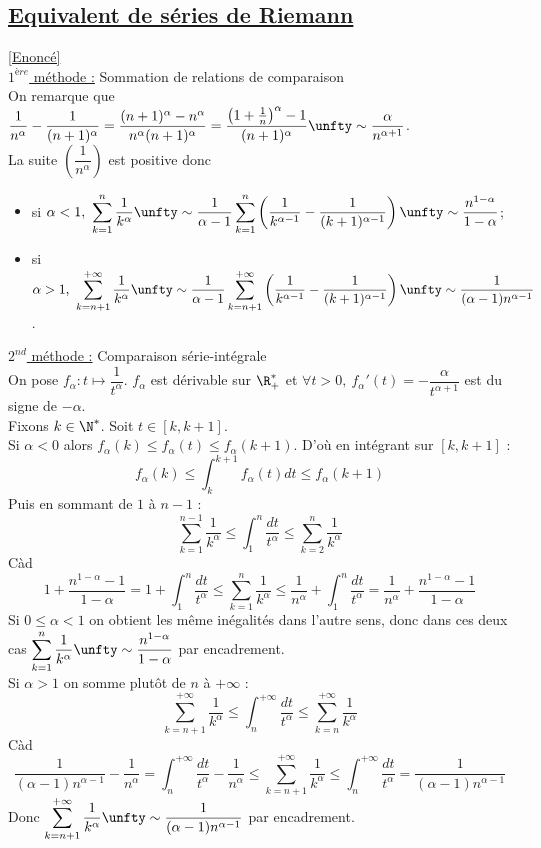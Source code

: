 \documentclass{book}
\begin{document}
	\subsection{\underline{Equivalent de séries de Riemann} }
	\label{sec:equivalent-de-series-de-riemann}
	\textcolor{blue}{\hyperref[Equivalent de séries de Riemann]{[Enoncé]}}\\
	\underline{$1^{ère}$ méthode :} Sommation de relations de comparaison\\
	On remarque que $\displaystyle\frac{1}{n^\alpha}-\frac{1}{(n+1)^\alpha}=\frac{(n+1)^\alpha-n^\alpha}{n^\alpha(n+1)^\alpha}=\frac{\left(1+\frac{1}{n}\right)^\alpha-1}{(n+1)^\alpha}\unfty\sim\frac{\alpha}{n^{\alpha+1}}$.\\
	La suite $\left(\dfrac{1}{n^\alpha}\right)$ est positive donc
	\begin{itemize}
		\item si $\alpha<1,\ \displaystyle\sum_{k=1}^n\frac{1}{k^\alpha}\unfty\sim\frac{1}{\alpha-1}\sum_{k=1}^n\left(\frac{1}{k^{\alpha-1}}-\frac{1}{(k+1)^{\alpha-1}}\right)\unfty\sim\frac{n^{1-\alpha}}{1-\alpha}$;
		\item si $\alpha>1,\ \displaystyle\sum_{k=n+1}^{+\infty}\frac{1}{k^\alpha}\unfty\sim\frac{1}{\alpha-1}\sum_{k=n+1}^{+\infty}\left(\frac{1}{k^{\alpha-1}}-\frac{1}{(k+1)^{\alpha-1}}\right)\unfty\sim\frac{1}{(\alpha-1)n^{\alpha-1}}$.
	\end{itemize}
	
	\underline{$2^{nd}$ méthode :} Comparaison série-intégrale\\
	On pose $f_\alpha:t\mapsto\dfrac{1}{t^\alpha}$. $f_\alpha$ est dérivable sur $\R^*_+$ et $\forall t>0,\ f_\alpha'(t)=-\dfrac{\alpha}{t^{\alpha+1}}$ est du signe de $-\alpha$.\\
	Fixons $k\in \N^*$. Soit $t\in [k,k+1]$.\\
	Si $\alpha<0$ alors $f_\alpha(k)\leq f_\alpha(t)\leq f_\alpha(k+1)$. D'où en intégrant sur $[k,k+1]$ :
	$$f_\alpha(k)\leq \displaystyle\int_k^{k+1}f_\alpha(t)dt\leq f_\alpha(k+1)$$
	Puis en sommant de $1$ à $n-1$ :\\
	$$\sum_{k=1}^{n-1}\frac{1}{k^\alpha}\leq \int_1^n\frac{dt}{t^\alpha}\leq \sum_{k=2}^n\frac{1}{k^\alpha}$$
	Càd
	$$1+\frac{n^{1-\alpha}-1}{1-\alpha}=1+\int_1^n\frac{dt}{t^\alpha}\leq\sum_{k=1}^n\frac{1}{k^\alpha}\leq \frac{1}{n^\alpha}+\int_1^n\frac{dt}{t^\alpha}=\frac{1}{n^\alpha}+\frac{n^{1-\alpha}-1}{1-\alpha}$$
	Si $0\leq\alpha<1$ on obtient les même inégalités dans l'autre sens, donc dans ces deux cas $\displaystyle\sum_{k=1}^n\frac{1}{k^\alpha}\unfty\sim\frac{n^{1-\alpha}}{1-\alpha}$ par encadrement.\\
	Si $\alpha>1$ on somme plutôt de $n$ à $+\infty$ :
	$$\sum_{k=n+1}^{+\infty}\frac{1}{k^\alpha}\leq \int_n^{+\infty}\frac{dt}{t^\alpha}\leq \sum_{k=n}^{+\infty}\frac{1}{k^\alpha}$$
	Càd
	$$\frac{1}{(\alpha-1)n^{\alpha-1}}-\frac{1}{n^\alpha}=\int_n^{+\infty}\frac{dt}{t^\alpha}-\frac{1}{n^\alpha}\leq\sum_{k=n+1}^{+\infty}\frac{1}{k^\alpha}\leq \int_n^{+\infty}\frac{dt}{t^\alpha}=\frac{1}{(\alpha-1)n^{\alpha-1}}$$
	Donc $\displaystyle\sum_{k=n+1}^{+\infty}\frac{1}{k^\alpha}\unfty\sim\frac{1}{(\alpha-1)n^{\alpha-1}}$ par encadrement.
	
\end{document}
